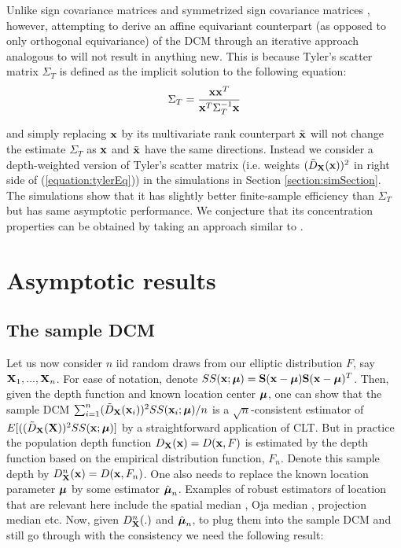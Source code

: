 \documentclass[fleqn,12pt]{article}
\begin{document}
Unlike sign covariance matrices and symmetrized sign covariance matrices \citep{dumbgen98}, however, attempting to derive an affine equivariant counterpart (as opposed to only orthogonal equivariance) of the DCM through an iterative approach analogous to \cite{tyler87} will not result in anything new. This is because Tyler's scatter matrix $\Sigma_T$ is defined as the implicit solution to the following equation:
\begin{equation} \label{equation:tylerEq}
\Sigma_T = \frac{{\bf{x}} {\bf{x}}^T}{{\bf{x}}^T \Sigma_T^{-1} {\bf{x}}}
\end{equation}

and simply replacing ${\bf{x}}$ by its multivariate rank counterpart $\tilde{{\bf{x}}}$ will not change the estimate $\Sigma_T$ as ${\bf{x}}$ and $\tilde {{\bf{x}}}$ have the same directions. Instead we consider a depth-weighted version of Tyler's scatter matrix (i.e. weights $(\tilde D_{\mathbf{X}}({\bf{x}}))^2$ in right side of (\ref{equation:tylerEq})) in the simulations in Section \ref{section:simSection}. The simulations show that it has slightly better finite-sample efficiency than $\Sigma_T$ but has same asymptotic performance. We conjecture that its concentration properties can be obtained by taking an approach similar to \cite{soloveychik14}.

\section{Asymptotic results}
\subsection{The sample DCM}
Let us now consider $n$ iid random draws from our elliptic distribution $F$, say ${\mathbf{X}}_1,...,{\mathbf{X}}_n$. For ease of notation, denote $SS({\bf{x}}; {\boldsymbol{\mu}}) = {\mathbf{S}}({\bf{x}} - {\boldsymbol{\mu}}) {\mathbf{S}}({\bf{x}} - {\boldsymbol{\mu}})^T$. Then, given the depth function and known location center ${\boldsymbol{\mu}}$, one can show that the sample DCM $\sum_{i=1}^n (\tilde D_{\mathbf{X}}({\bf{x}}_i))^2SS({\bf{x}}_i; {\boldsymbol{\mu}}) /n$ is a $\sqrt n$-consistent estimator of $E[( (\tilde D_{\mathbf{X}} ({\mathbf{X}}))^2 SS({\bf{x}}; {\boldsymbol{\mu}})]$ by a straightforward application of CLT. But in practice the population depth function $D_{\mathbf{X}}({\bf{x}}) = D({\bf{x}}, F)$ is estimated by the depth function based on the empirical distribution function, $F_n$. Denote this sample depth by $D^n_{\mathbf{X}} ({\bf{x}}) = D({\bf{x}}, F_n)$. One also needs to replace the known location parameter ${\boldsymbol{\mu}}$ by some estimator $\hat{{\boldsymbol{\mu}}}_n$. Examples of robust estimators of location that are relevant here include the spatial median \citep{haldane48,brown83}, Oja median \citep{oja83}, projection median \citep{zuo03} etc. Now, given $D^n_{\mathbf{X}}(.)$ and $\hat {{\boldsymbol{\mu}}}_n$, to plug them into the sample DCM and still go through with the consistency we need the following result:
\end{document}
